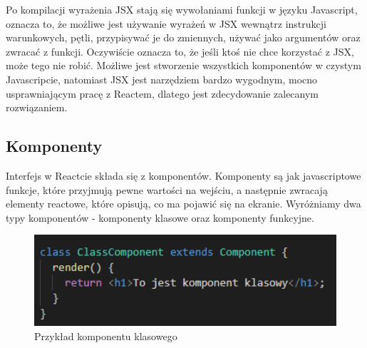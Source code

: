 \documentclass[oneside,polski,logo,indent]{amuthesis}
\begin{document}
\begin{enumerate}
\begin{enumerate}
{Po kompilacji wyrażenia JSX stają się wywołaniami funkcji w języku Javascript, oznacza to, że możliwe jest używanie wyrażeń w JSX wewnątrz instrukcji warunkowych, pętli, przypisywać je do zmiennych, używać jako argumentów oraz zwracać z funkcji.
Oczywiście oznacza to, że jeśli ktoś nie chce korzystać z JSX, może tego nie robić. Możliwe jest stworzenie wszystkich komponentów w czystym Javascripcie, natomiast JSX jest narzędziem bardzo wygodnym, mocno usprawniającym pracę z Reactem, dlatego jest zdecydowanie zalecanym rozwiązaniem.

}

\subsection{Komponenty}
{
Interfejs w Reactcie składa się z komponentów. Komponenty są jak javascriptowe funkcje, które przyjmują pewne wartości na wejściu, a następnie zwracają elementy reactowe, które opisują, co ma pojawić się na ekranie.
Wyróżniamy dwa typy komponentów - komponenty klasowe oraz komponenty funkcyjne.
\begin{figure}[H]
\centering
\includegraphics[width=13cm]{Komponent klasowy.png}
\caption{Przykład komponentu klasowego
}
\label{komponent klasowy}
\end{figure}

}
\end{enumerate}
\end{enumerate}
\end{document}
